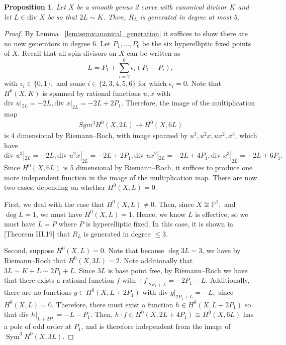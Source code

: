 \documentclass{amsart}
\theoremstyle{plain}
\newtheorem{prop}[thm]{Proposition}
\theoremstyle{definition}
\theoremstyle{remark}
\numberwithin{equation}{section}
\newcommand\BP{{\mathbb P}}
\newcommand \di{\text{div }}
\DeclareMathOperator{\sym}{Sym}
\begin{document}
\begin{prop}
\label{prop:genus_2_generation_5}
Let $X$ be a smooth genus 2 curve with canonical divisor $K$ and let $L \in \di X$ be so that $2L \sim K$. 
Then, $R_L$ is generated in degree at most $5$.
\end{prop}
\begin{proof}
By Lemma ~\ref{lem:semicanonical_generation} it suffices to show there are no new generators in degree 6.
Let $P_1,\ldots, P_6$ be the six hyperelliptic fixed points of $X$. 
Recall that all spin divisors on $X$ can be written as 
$$L = P_1 + \sum_{i=2}^{6} \epsilon_i (P_1 - P_i),$$ 
with $\epsilon_i \in \{0,1\},$ and some $i \in \{2, 3, 4, 5, 6\}$ for which $\epsilon_i = 0$. 
Note that $H^0(X,K)$ is spanned by rational functions $u,x$ with $\di u|_{2L} = -2L, \di x|_{2L} = -2L + 2P_1.$ Therefore, the image of the multiplication map 
\begin{align*}
	Sym^3 H^0(X,2L) \rightarrow H^0(X,6L)
\end{align*}
is 4 dimensional by Riemann--Roch, with image spanned by $u^3,u^2x,ux^2,x^3$, 
which have $\di u^3|_{2L} = -2L, \di u^2x|_{2L} = -2L + 2P_1,\di ux^2|_{2L} = -2L+4P_1, \di x^3|_{2L} = -2L + 6P_1.$ 
Since $H^0(X,6L)$ is 5 dimensional by Riemann--Roch,
it suffices to produce one more independent function in the image of the multiplication map.
There are now two cases, depending on whether $H^0(X,L) = 0$.

First, we deal with the case that $H^0(X,L) \neq 0$. 
Then, since $X \not \cong \BP^1,$ and $\deg L = 1$, we must have $H^0(X,L) = 1$. Hence, we know $L$ is effective, so we must have $L = P$ where $P$ is hyperelliptic fixed. In this case, it is shown in \cite{neves:halfcan}[Theorem III.19] that $R_L$ is generated in degree $\leq 3$.

Second, suppose $H^0(X,L) = 0$.
Note that because $\deg 3L = 3$, we have by Riemann--Roch that $H^0(X,3L) = 2$. 
Note additionally that $3L \sim K + L \sim 2P_1 + L$. Since $3L$ is base point free, by Riemann--Roch
we have that there exists a rational function $f$ with $\div f|_{2P_1 + L} = -2P_1 - L.$ Additionally, there are no functions $g \in H^0(X,L + 2P_1)$ 
with $\di g|_{2P_1 + L} = -L,$ since $H^0(X,L) = 0.$ Therefore, there must 
exist a function $h \in H^0(X,L+2P_1)$ so that $\di h|_{L + 2P_1} = -L - P_1$.
Then, $h \cdot f \in H^0(X,2L + 4P_1) \cong H^0(X,6L)$ has a pole of odd 
order at $P_1$, and is therefore independent from the image of $\sym^3 H^0(X,3L)$.
\end{proof}
\end{document}
